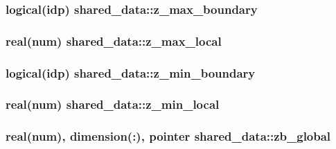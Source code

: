 \subsubsection[{\texorpdfstring{z\+\_\+max\+\_\+boundary}{z_max_boundary}}]{\setlength{\rightskip}{0pt plus 5cm}logical(idp) shared\+\_\+data\+::z\+\_\+max\+\_\+boundary}\hypertarget{namespaceshared__data_ac180e0f2fae72319d7a6be1f1bbf4bb3}{}\label{namespaceshared__data_ac180e0f2fae72319d7a6be1f1bbf4bb3}
\subsubsection[{\texorpdfstring{z\+\_\+max\+\_\+local}{z_max_local}}]{\setlength{\rightskip}{0pt plus 5cm}real(num) shared\+\_\+data\+::z\+\_\+max\+\_\+local}\hypertarget{namespaceshared__data_a7931e0059b790ccef3cc00c59d806c7c}{}\label{namespaceshared__data_a7931e0059b790ccef3cc00c59d806c7c}
\subsubsection[{\texorpdfstring{z\+\_\+min\+\_\+boundary}{z_min_boundary}}]{\setlength{\rightskip}{0pt plus 5cm}logical(idp) shared\+\_\+data\+::z\+\_\+min\+\_\+boundary}\hypertarget{namespaceshared__data_aaa333d54e2048c0199124fa66e0c460e}{}\label{namespaceshared__data_aaa333d54e2048c0199124fa66e0c460e}
\subsubsection[{\texorpdfstring{z\+\_\+min\+\_\+local}{z_min_local}}]{\setlength{\rightskip}{0pt plus 5cm}real(num) shared\+\_\+data\+::z\+\_\+min\+\_\+local}\hypertarget{namespaceshared__data_a1fb130b65ef2a707c1a79f91089e7dc0}{}\label{namespaceshared__data_a1fb130b65ef2a707c1a79f91089e7dc0}
\subsubsection[{\texorpdfstring{zb\+\_\+global}{zb_global}}]{\setlength{\rightskip}{0pt plus 5cm}real(num), dimension(\+:), pointer shared\+\_\+data\+::zb\+\_\+global}\hypertarget{namespaceshared__data_afd2142e5ba5165c1826ad1826cb061e3}{}\label{namespaceshared__data_afd2142e5ba5165c1826ad1826cb061e3}

